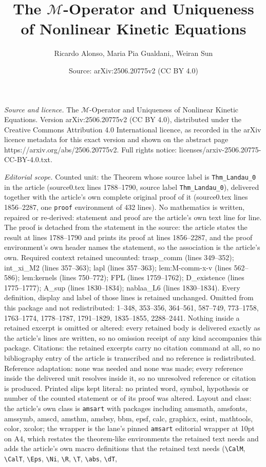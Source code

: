 \documentclass[10pt,a4paper]{amsart}
\title[The $\mathcal{M}$-Operator and Uniqueness of Nonlinear Kinet]{The $\mathcal{M}$-Operator and Uniqueness of Nonlinear Kinetic Equations}
\author{Ricardo Alonso, Maria Pia Gualdani,, Weiran Sun}
\date{Source: arXiv:2506.20775v2 (CC BY 4.0)}
\begin{document}
\maketitle

\noindent\emph{Source and licence.} The $\mathcal{M}$-Operator and Uniqueness of Nonlinear Kinetic Equations. Version arXiv:2506.20775v2 (CC BY 4.0), distributed under the Creative Commons Attribution 4.0 International licence, as recorded in the arXiv licence metadata for this exact version and shown on the abstract page https://arxiv.org/abs/2506.20775v2. Full rights notice: licenses/arxiv-2506.20775-CC-BY-4.0.txt.\par\smallskip

\noindent\textit{Editorial scope.} Counted unit: the Theorem whose source label is \texttt{Thm\_Landau\_0} in the article (source0.tex lines 1788--1790, source label \texttt{Thm\_Landau\_0}), delivered together with the article's own complete original proof of it (source0.tex lines 1856--2287, one \texttt{proof} environment of 432 lines). No mathematics is written, repaired or re-derived: statement and proof are the article's own text line for line. The proof is detached from the statement in the source: the article states the result at lines 1788--1790 and prints its proof at lines 1856--2287, and the proof environment's own header names the statement, so the association is the article's own. Required context retained uncounted: trasp\_comm (lines 349--352); int\_xi\_M2 (lines 357--363); lapl (lines 357--363); lem:M-comm-x-v (lines 562--586); lem:kernels (lines 750--772); FPL (lines 1759--1762); D\_existence (lines 1775--1777); A\_sup (lines 1830--1834); nablaa\_L6 (lines 1830--1834). Every definition, display and label of those lines is retained unchanged. Omitted from this package and not redistributed: 1--348, 353--356, 364--561, 587--749, 773--1758, 1763--1774, 1778--1787, 1791--1829, 1835--1855, 2288--2441. Nothing inside a retained excerpt is omitted or altered: every retained body is delivered exactly as the article's lines are written, so no omission receipt of any kind accompanies this package. Citations: the retained excerpts carry no citation command at all, so no bibliography entry of the article is transcribed and no reference is redistributed. Reference adaptation: none was needed and none was made; every reference inside the delivered unit resolves inside it, so no unresolved reference or citation is produced. Printed slips kept literal: no printed word, symbol, hypothesis or number of the counted statement or of its proof was altered. Layout and class: the article's own class is \texttt{amsart} with packages including amsmath, amsfonts, amssymb, amscd, amsthm, amsbsy, bbm, epsf, calc, graphicx, esint, mathtools, color, xcolor; the wrapper is the lane's pinned \texttt{amsart} editorial wrapper at 10pt on A4, which restates the theorem-like environments the retained text needs and adds the article's own macro definitions that the retained text needs (\texttt{\textbackslash CalM}, \texttt{\textbackslash CalT}, \texttt{\textbackslash Eps}, \texttt{\textbackslash Ni}, \texttt{\textbackslash R}, \texttt{\textbackslash T}, \texttt{\textbackslash abs}, \texttt{\textbackslash dT}, 
\end{document}
